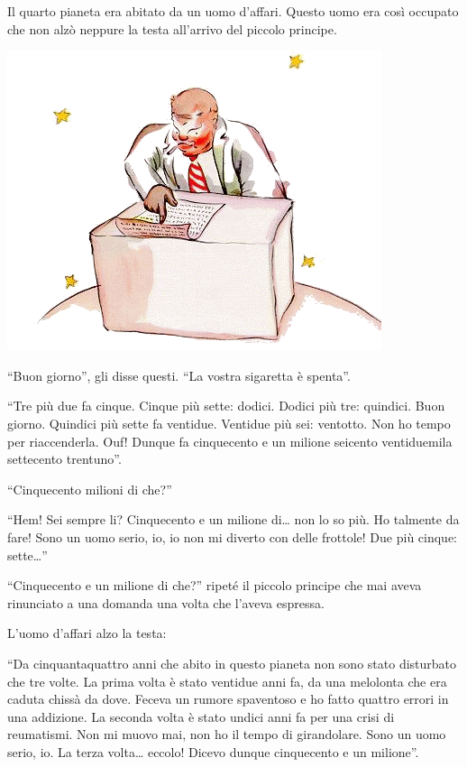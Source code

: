 \documentclass[11pt]{scrbook}
\begin{document}
Il quarto pianeta era abitato da un uomo d'affari. Questo uomo era così occupato che non alzò neppure la testa all'arrivo del piccolo principe.

\begin{center}
\includegraphics{img/13a}
\end{center}

``Buon giorno'', gli disse questi. ``La vostra sigaretta è spenta''.

``Tre più due fa cinque. Cinque più sette: dodici. Dodici più tre: quindici. Buon giorno. Quindici più sette fa ventidue. Ventidue più sei: ventotto. Non ho tempo per riaccenderla. Ouf! Dunque fa cinquecento e un milione seicento ventiduemila settecento trentuno''.

``Cinquecento milioni di che?''

``Hem! Sei sempre li? Cinquecento e un milione di\ldots{} non lo so più. Ho talmente da fare! Sono un uomo serio, io, io non mi diverto con delle frottole! Due più cinque: sette\ldots{}''

``Cinquecento e un milione di che?'' ripeté il piccolo principe che mai aveva rinunciato a una domanda una volta che l'aveva espressa.

L'uomo d'affari alzo la testa:

``Da cinquantaquattro anni che abito in questo pianeta non sono stato disturbato che tre volte. La prima volta è stato ventidue anni fa, da una melolonta che era caduta chissà da dove. Feceva un rumore spaventoso e ho fatto quattro errori in una addizione. La seconda volta è stato undici anni fa per una crisi di reumatismi. Non mi muovo mai, non ho il tempo di girandolare. Sono un uomo serio, io. La terza volta\ldots{} eccolo! Dicevo dunque cinquecento e un milione''.
\end{document}

